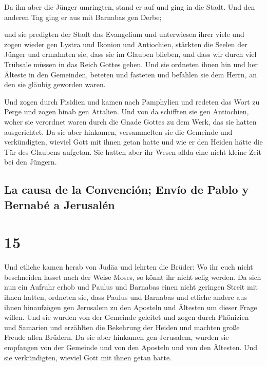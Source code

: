  Da ihn aber die Jünger umringten, stand er auf und ging
in die Stadt. Und den anderen Tag ging er aus mit Barnabas gen Derbe;

 und sie predigten der Stadt das Evangelium und
unterwiesen ihrer viele und zogen wieder gen Lystra und Ikonion und
Antiochien,  stärkten die Seelen der Jünger und ermahnten
sie, dass sie im Glauben blieben, und dass wir durch viel Trübsale
müssen in das Reich Gottes gehen.  Und sie ordneten ihnen
hin und her Älteste in den Gemeinden, beteten und fasteten und befahlen
sie dem Herrn, an den sie gläubig geworden waren.

 Und zogen durch Pisidien und kamen nach Pamphylien
 und redeten das Wort zu Perge und zogen hinab gen
Attalien.  Und von da schifften sie gen Antiochien, woher
sie verordnet waren durch die Gnade Gottes zu dem Werk, das sie hatten
ausgerichtet.  Da sie aber hinkamen, versammelten sie die
Gemeinde und verkündigten, wieviel Gott mit ihnen getan hatte und wie er
den Heiden hätte die Tür des Glaubens aufgetan.  Sie
hatten aber ihr Wesen allda eine nicht kleine Zeit bei den Jüngern.

\hypertarget{la-causa-de-la-convenciuxf3n-envuxedo-de-pablo-y-bernabuxe9-a-jerusaluxe9n}{%
\subsection{La causa de la Convención; Envío de Pablo y Bernabé a
Jerusalén}\label{la-causa-de-la-convenciuxf3n-envuxedo-de-pablo-y-bernabuxe9-a-jerusaluxe9n}}

\hypertarget{section-14}{%
\section{15}\label{section-14}}

 Und etliche kamen herab von Judäa und lehrten die Brüder:
Wo ihr euch nicht beschneiden lasset nach der Weise Moses, so könnt ihr
nicht selig werden.  Da sich nun ein Aufruhr erhob und
Paulus und Barnabas einen nicht geringen Streit mit ihnen hatten,
ordneten sie, dass Paulus und Barnabas und etliche andere aus ihnen
hinaufzögen gen Jerusalem zu den Aposteln und Ältesten um dieser Frage
willen.  Und sie wurden von der Gemeinde geleitet und
zogen durch Phönizien und Samarien und erzählten die Bekehrung der
Heiden und machten große Freude allen Brüdern.  Da sie
aber hinkamen gen Jerusalem, wurden sie empfangen von der Gemeinde und
von den Aposteln und von den Ältesten. Und sie verkündigten, wieviel
Gott mit ihnen getan hatte.

